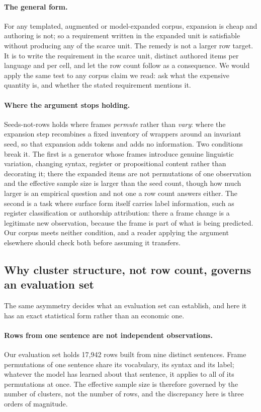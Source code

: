 \paragraph{The general form.} For any templated, augmented or model-expanded
corpus, expansion is cheap and authoring is not; so a requirement written in the
expanded unit is satisfiable without producing any of the scarce unit. The remedy
is not a larger row target. It is to write the requirement in the scarce unit,
distinct authored items per language and per cell, and let the row count follow
as a consequence. We would apply the same test to any corpus claim we read: ask
what the expensive quantity is, and whether the stated requirement mentions it.

\paragraph{Where the argument stops holding.} Seeds-not-rows holds where frames
\emph{permute} rather than \emph{vary}: where the expansion step recombines a
fixed inventory of wrappers around an invariant seed, so that expansion adds
tokens and adds no information. Two conditions break it. The first is a generator
whose frames introduce genuine linguistic variation, changing syntax, register or
propositional content rather than decorating it; there the expanded items are not
permutations of one observation and the effective sample size is larger than the
seed count, though how much larger is an empirical question and not one a row
count answers either. The second is a task where surface form itself carries
label information, such as register classification or authorship attribution:
there a frame change is a legitimate new observation, because the frame is part
of what is being predicted. Our corpus meets neither condition, and a reader
applying the argument elsewhere should check both before assuming it transfers.

\subsection{Why cluster structure, not row count, governs an evaluation set}

The same asymmetry decides what an evaluation set can establish, and here it has
an exact statistical form rather than an economic one.

\paragraph{Rows from one sentence are not independent observations.} Our
evaluation set holds 17{,}942 rows built from nine distinct sentences. Frame
permutations of one sentence share its vocabulary, its syntax and its label;
whatever the model has learned about that sentence, it applies to all of its
permutations at once. The effective sample size is therefore governed by the
number of clusters, not the number of rows, and the discrepancy here is three
orders of magnitude.

